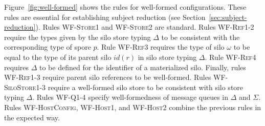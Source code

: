 Figure~\ref{fig:well-formed} shows the rules for well-formed
configurations. These rules are essential for establishing subject
reduction (see Section~\ref{sec:subject-reduction}). Rules
\textsc{WF-Store1} and \textsc{WF-Store2} are standard.  Rules
\textsc{WF-Ref1-2} require the types given by the silo store typing
$\Delta$ to be consistent with the corresponding type of spore
$p$. Rule \textsc{WF-Ref3} requires the type of silo $\omega$ to be
equal to the type of its parent silo $id(r)$ in silo store typing
$\Delta$. Rule \textsc{WF-Ref4} requires $\Delta$ to be defined for
the identifier of a materialized silo. Finally, rules
\textsc{WF-Ref1-3} require parent silo references to be well-formed.
Rules \textsc{WF-SiloStore1-3} require a well-formed silo store to be
consistent with silo store typing $\Delta$. Rules \textsc{WF-Q1-4}
specify well-formedness of message queues in $\Delta$ and $\Sigma$.
Rules \textsc{WF-HostConfig}, \textsc{WF-Host1}, and \textsc{WF-Host2}
combine the previous rules in the expected way.

